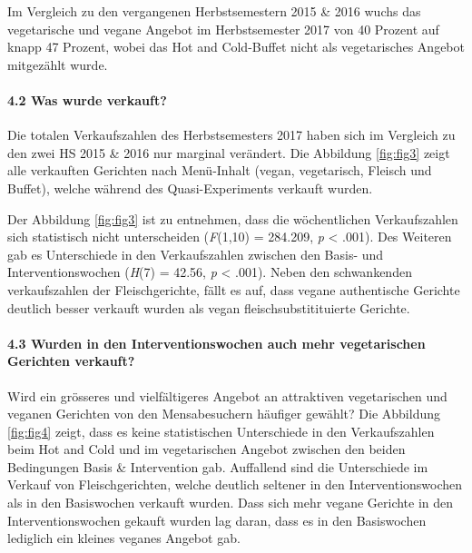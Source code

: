 \documentclass[12pt,ngerman,]{article}
\let\oldparagraph\paragraph
\renewcommand{\paragraph}[1]{\oldparagraph{#1}\mbox{}}
\begin{document}
\par

Im Vergleich zu den vergangenen Herbstsemestern 2015 \& 2016 wuchs das
vegetarische und vegane Angebot im Herbstsemester 2017 von 40 Prozent
auf knapp 47 Prozent, wobei das Hot and Cold-Buffet nicht als
vegetarisches Angebot mitgezählt wurde. \newpage

\hypertarget{was-wurde-verkauft}{%
\paragraph{4.2 Was wurde verkauft?}\label{was-wurde-verkauft}}

Die totalen Verkaufszahlen des Herbstsemesters 2017 haben sich im
Vergleich zu den zwei HS 2015 \& 2016 nur marginal verändert. Die
Abbildung \ref{fig:fig3} zeigt alle verkauften Gerichten nach
Menü-Inhalt (vegan, vegetarisch, Fleisch und Buffet), welche während des
Quasi-Experiments verkauft wurden.

Der Abbildung \ref{fig:fig3} ist zu entnehmen, dass die wöchentlichen
Verkaufszahlen sich statistisch nicht unterscheiden (\emph{F}(1,10) =
284.209, \emph{p} \textless{} .001). Des Weiteren gab es Unterschiede in
den Verkaufszahlen zwischen den Basis- und Interventionswochen
(\emph{H}(7) = 42.56, \emph{p} \textless{} .001). Neben den schwankenden
verkaufszahlen der Fleischgerichte, fällt es auf, dass vegane
authentische Gerichte deutlich besser verkauft wurden als vegan
fleischsubstitituierte Gerichte.

\newpage

\hypertarget{wurden-in-den-interventionswochen-auch-mehr-vegetarischen-gerichten-verkauft}{%
\paragraph{4.3 Wurden in den Interventionswochen auch mehr vegetarischen
Gerichten
verkauft?}\label{wurden-in-den-interventionswochen-auch-mehr-vegetarischen-gerichten-verkauft}}

Wird ein grösseres und vielfältigeres Angebot an attraktiven
vegetarischen und veganen Gerichten von den Mensabesuchern häufiger
gewählt? Die Abbildung \ref{fig:fig4} zeigt, dass es keine statistischen
Unterschiede in den Verkaufszahlen beim Hot and Cold und im
vegetarischen Angebot zwischen den beiden Bedingungen Basis \&
Intervention gab. Auffallend sind die Unterschiede im Verkauf von
Fleischgerichten, welche deutlich seltener in den Interventionswochen
als in den Basiswochen verkauft wurden. Dass sich mehr vegane Gerichte
in den Interventionswochen gekauft wurden lag daran, dass es in den
Basiswochen lediglich ein kleines veganes Angebot gab.
\end{document}
